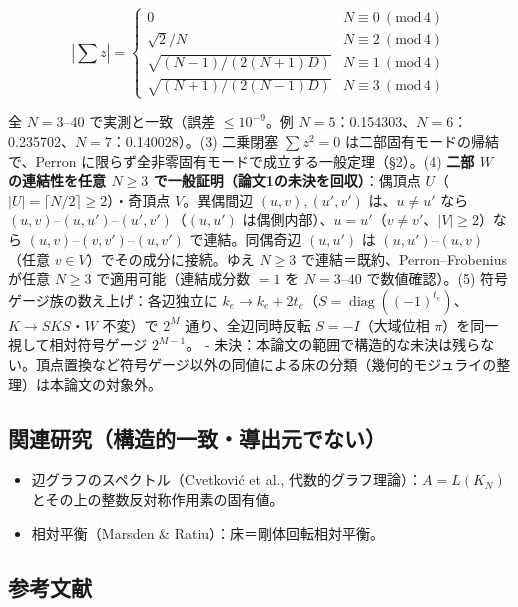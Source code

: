 \documentclass[
  a4paper,
]{ltjsarticle}
\providecommand{\tightlist}{%
  \setlength{\itemsep}{0pt}\setlength{\parskip}{0pt}}
\begin{document}
\[|\textstyle\sum z|=\begin{cases}0&N\equiv0\ (\mathrm{mod}\,4)\\[1mm] \sqrt2/N&N\equiv2\ (\mathrm{mod}\,4)\\[1mm] \sqrt{(N-1)/(2(N+1)D)}&N\equiv1\ (\mathrm{mod}\,4)\\[1mm] \sqrt{(N+1)/(2(N-1)D)}&N\equiv3\ (\mathrm{mod}\,4)\end{cases}\]

全 \(N=3\)--\(40\) で実測と一致（誤差 \(\le10^{-9}\)。例
\(N=5\)：0.154303、\(N=6\)：0.235702、\(N=7\)：0.140028）。(3) 二乗閉塞
\(\sum z^2=0\) は二部固有モードの帰結で、Perron
に限らず全非零固有モードで成立する一般定理（§2）。(4) \textbf{二部 \(W\)
の連結性を任意 \(N\ge3\) で一般証明（論文1の未決を回収）}：偶頂点
\(U\)（\(|U|=\lceil N/2\rceil\ge2\)）・奇頂点 \(V\)。異偶間辺
\((u,v),(u',v')\) は、\(u\neq u'\) なら
\((u,v)\)--\((u,u')\)--\((u',v')\)（\((u,u')\)
は偶側内部）、\(u=u'\)（\(v\neq v'\)、\(|V|\ge2\)）なら
\((u,v)\)--\((v,v')\)--\((u,v')\) で連結。同偶奇辺 \((u,u')\) は
\((u,u')\)--\((u,v)\)（任意 \(v\in V\)）でその成分に接続。ゆえ \(N\ge3\)
で連結＝既約、Perron--Frobenius が任意 \(N\ge3\) で適用可能（連結成分数
\(=1\) を \(N=3\)--\(40\) で数値確認）。(5)
符号ゲージ族の数え上げ：各辺独立に
\(k_e\to k_e+2t_e\)（\(S=\operatorname{diag}((-1)^{t_e})\)、\(K\to SKS\)・\(W\)
不変）で \(2^M\) 通り、全辺同時反転 \(S=-I\)（大域位相
\(\pi\)）を同一視して相対符号ゲージ \(2^{M-1}\)。 -
未決：本論文の範囲で構造的な未決は残らない。頂点置換など符号ゲージ以外の同値による床の分類（幾何的モジュライの整理）は本論文の対象外。

\subsection{関連研究（構造的一致・導出元でない）}\label{ux95a2ux9023ux7814ux7a76ux69cbux9020ux7684ux4e00ux81f4ux5c0eux51faux5143ux3067ux306aux3044}

\begin{itemize}
\tightlist
\item
  辺グラフのスペクトル（Cvetković et al.,
  代数的グラフ理論）：\(A=L(K_N)\) とその上の整数反対称作用素の固有値。
\item
  相対平衡（Marsden \& Ratiu）：床＝剛体回転相対平衡。
\end{itemize}

\subsection{参考文献}\label{ux53c2ux8003ux6587ux732e}
\end{document}
